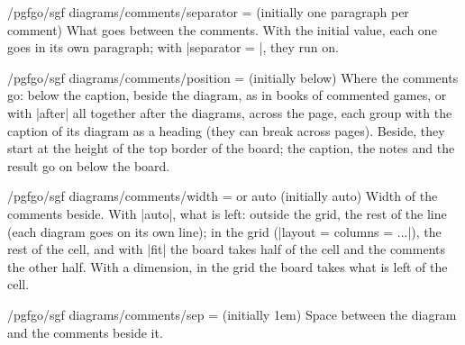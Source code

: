 
\begin{key}{/pgfgo/sgf diagrams/comments/separator =  (initially one paragraph per comment)}
	What goes between the comments. With the initial value, each one goes in its own paragraph; with |separator = {\quad}|, they run on.

	\begin{codeexample}
	\end{codeexample}
\end{key}

\begin{key}{/pgfgo/sgf diagrams/comments/position =  (initially below)}
	Where the comments go: below the caption, beside the diagram, as in books of commented games, or with |after| all together after the diagrams, across the page, each group with the caption of its diagram as a heading (they can break across pages). Beside, they start at the height of the top border of the board; the caption, the notes and the result go on below the board.

	\begin{codeexample}
	\end{codeexample}
\end{key}

\begin{key}{/pgfgo/sgf diagrams/comments/width =  or auto (initially auto)}
	Width of the comments beside. With |auto|, what is left: outside the grid, the rest of the line (each diagram goes on its own line); in the grid (|layout = {columns = ...}|), the rest of the cell, and with |fit| the board takes half of the cell and the comments the other half. With a dimension, in the grid the board takes what is left of the cell.
\end{key}

\begin{key}{/pgfgo/sgf diagrams/comments/sep =  (initially 1em)}
	Space between the diagram and the comments beside it.

	\begin{codeexample}
	\end{codeexample}
\end{key}


